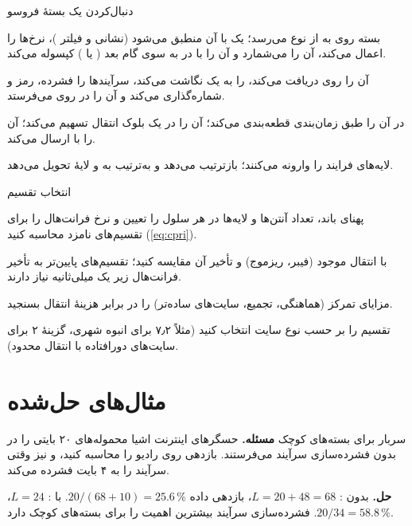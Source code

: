 \documentclass[11pt,a4paper]{article}
\begin{document}
\begin{procedurebox}{دنبال‌کردن یک بستهٔ فروسو}\label{proc:dl}
\begin{steps}
  \item بسته روی  به  از نوع  می‌رسد؛ یک  با آن منطبق می‌شود (نشانی  و فیلتر )،  نرخ‌ها را
        اعمال می‌کند،  آن را می‌شمارد و  آن را با  در  به سوی گام بعد ( یا ) کپسوله می‌کند.
  \item {} آن را روی  دریافت می‌کند،   را به یک  نگاشت می‌کند،  سرآیندها را فشرده، رمز و
        شماره‌گذاری می‌کند و آن را در  روی  می‌فرستد.
  \item {} در  آن را طبق زمان‌بندی  قطعه‌بندی می‌کند؛  آن را در یک بلوک انتقال تسهیم می‌کند؛  آن را
        با  ارسال می‌کند.
  \item لایه‌های  فرایند را وارونه می‌کنند؛  بازترتیب می‌دهد و به‌ترتیب به  و لایهٔ  تحویل می‌دهد.
\end{steps}
\end{procedurebox}

\begin{procedurebox}{انتخاب تقسیم }\label{proc:split}
\begin{steps}
  \item پهنای باند، تعداد آنتن‌ها و لایه‌ها در هر سلول را تعیین و نرخ فرانت‌هال را برای تقسیم‌های نامزد محاسبه کنید (\cref{eq:cpri}).
  \item با انتقال موجود (فیبر، ریزموج) و تأخیر آن مقایسه کنید؛ تقسیم‌های پایین‌تر به تأخیر فرانت‌هال زیر یک میلی‌ثانیه نیاز دارند.
  \item مزایای تمرکز (هماهنگی، تجمیع، سایت‌های ساده‌تر) را در برابر هزینهٔ انتقال بسنجید.
  \item تقسیم را بر حسب نوع سایت انتخاب کنید (مثلاً ۷٫۲ برای  انبوه شهری، گزینهٔ ۲ برای سایت‌های دورافتاده با انتقال محدود).
\end{steps}
\end{procedurebox}

\section{مثال‌های حل‌شده}

\begin{examplebox}{سربار برای بسته‌های کوچک}\label{ex:oh}
\textbf{مسئله.} حسگرهای اینترنت اشیا محموله‌های ۲۰ بایتی را در  بدون فشرده‌سازی سرآیند می‌فرستند. بازدهی روی رادیو را محاسبه کنید،
و نیز وقتی  سرآیند  را به ۴ بایت فشرده می‌کند.

\textbf{حل.} بدون : $L = 20 + 48 = 68$، بازدهی داده $20/(68+10) = 25.6\,\%$. با : $L = 24$، $20/34 = 58.8\,\%$. فشرده‌سازی سرآیند
بیشترین اهمیت را برای بسته‌های کوچک دارد.
\end{examplebox}
\end{document}
